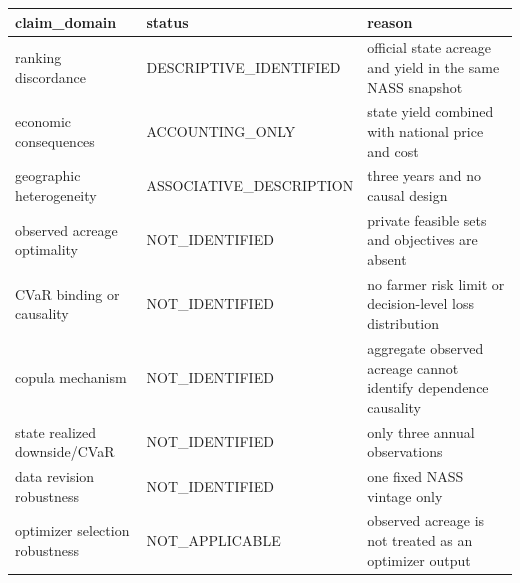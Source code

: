 \begin{tabular}{lll}
\toprule
claim\_domain & status & reason \\
\midrule
ranking discordance & DESCRIPTIVE\_IDENTIFIED & official state acreage and yield in the same NASS snapshot \\
economic consequences & ACCOUNTING\_ONLY & state yield combined with national price and cost \\
geographic heterogeneity & ASSOCIATIVE\_DESCRIPTION & three years and no causal design \\
observed acreage optimality & NOT\_IDENTIFIED & private feasible sets and objectives are absent \\
CVaR binding or causality & NOT\_IDENTIFIED & no farmer risk limit or decision-level loss distribution \\
copula mechanism & NOT\_IDENTIFIED & aggregate observed acreage cannot identify dependence causality \\
state realized downside/CVaR & NOT\_IDENTIFIED & only three annual observations \\
data revision robustness & NOT\_IDENTIFIED & one fixed NASS vintage only \\
optimizer selection robustness & NOT\_APPLICABLE & observed acreage is not treated as an optimizer output \\
\bottomrule
\end{tabular}
